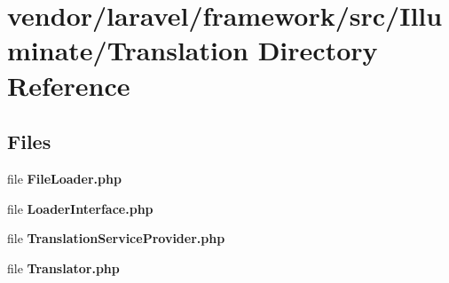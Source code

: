 \section{vendor/laravel/framework/src/\+Illuminate/\+Translation Directory Reference}
\label{dir_a7cce9899dcf9b2077d20619172b9c15}
\subsection*{Files}
\begin{DoxyCompactItemize}
\item 
file {\bf File\+Loader.\+php}
\item 
file {\bf Loader\+Interface.\+php}
\item 
file {\bf Translation\+Service\+Provider.\+php}
\item 
file {\bf Translator.\+php}
\end{DoxyCompactItemize}
